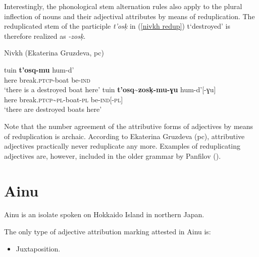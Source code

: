Interestingly, the phonological stem alternation rules also apply to the plural inflection of nouns and their adjectival attributes by means of reduplication. The reduplicated stem of the participle \textit{t'osk̦} in (\ref{nivkh redup}) t‘destroyed’ is therefore realized as \textit{-zosk̦}.
\begin{exe}
\ex \label{nivkh redup}
\rm{Nivkh (Ekaterina Gruzdeva, pc)}
\begin{xlist}
\ex 
\gll	tuin \textbf{t'osq-mu} hum-d'\\
	here break.\textsc{ptcp}-boat be-\textsc{ind}\\
\glt	‘there is a destroyed boat here’ 
\ex \label{nivkh unaltered}
\gll	tuin \textbf{t'osq\textasciitilde zosk̦-mu-ɣu} hum-d'[-ɣu]\\
	here break.\textsc{ptcp}\textasciitilde \textsc{pl}-boat-\textsc{pl} be-\textsc{ind}[-\textsc{pl}]\\
\glt	‘there are destroyed boats here’
\end{xlist}
\end{exe}
Note that the number agreement of the attributive forms of adjectives by means of reduplication is archaic. According to Ekaterina Gruzdeva (pc), attributive adjectives practically never reduplicate any more. Examples of reduplicating adjectives are, however, included in the older grammar by Panfilov (\citeyear{panfilov1965}).

\section{Ainu}
Ainu is an isolate spoken on Hokkaido Island in northern Japan.

The only type of adjective attribution marking attested in Ainu is:
\begin{itemize}
\item Juxtaposition.
\end{itemize}

